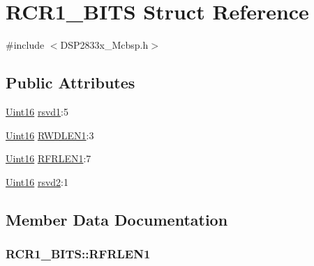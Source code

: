 \hypertarget{struct_r_c_r1___b_i_t_s}{}\section{R\+C\+R1\+\_\+\+B\+I\+T\+S Struct Reference}
\label{struct_r_c_r1___b_i_t_s}


{\ttfamily \#include $<$D\+S\+P2833x\+\_\+\+Mcbsp.\+h$>$}

\subsection*{Public Attributes}
\begin{DoxyCompactItemize}
\item 
\hyperlink{_d_s_p2833x___device_8h_a59a9f6be4562c327cbfb4f7e8e18f08b}{Uint16} \hyperlink{struct_r_c_r1___b_i_t_s_a0a7093ae73c7ad21567db066f96c786a}{rsvd1}\+:5
\item 
\hyperlink{_d_s_p2833x___device_8h_a59a9f6be4562c327cbfb4f7e8e18f08b}{Uint16} \hyperlink{struct_r_c_r1___b_i_t_s_a5997e83558e0dc6eaf5e3c9b90bd6adc}{R\+W\+D\+L\+E\+N1}\+:3
\item 
\hyperlink{_d_s_p2833x___device_8h_a59a9f6be4562c327cbfb4f7e8e18f08b}{Uint16} \hyperlink{struct_r_c_r1___b_i_t_s_a26f328670d8823f389803dd4c3649827}{R\+F\+R\+L\+E\+N1}\+:7
\item 
\hyperlink{_d_s_p2833x___device_8h_a59a9f6be4562c327cbfb4f7e8e18f08b}{Uint16} \hyperlink{struct_r_c_r1___b_i_t_s_ad8d1653bf4581af4d2e0fd907fbaaf91}{rsvd2}\+:1
\end{DoxyCompactItemize}


\subsection{Member Data Documentation}
\hypertarget{struct_r_c_r1___b_i_t_s_a26f328670d8823f389803dd4c3649827}{}
\subsubsection[{R\+F\+R\+L\+E\+N1}]{ R\+C\+R1\+\_\+\+B\+I\+T\+S\+::\+R\+F\+R\+L\+E\+N1}\label{struct_r_c_r1___b_i_t_s_a26f328670d8823f389803dd4c3649827}
\hypertarget{struct_r_c_r1___b_i_t_s_a0a7093ae73c7ad21567db066f96c786a}{}

